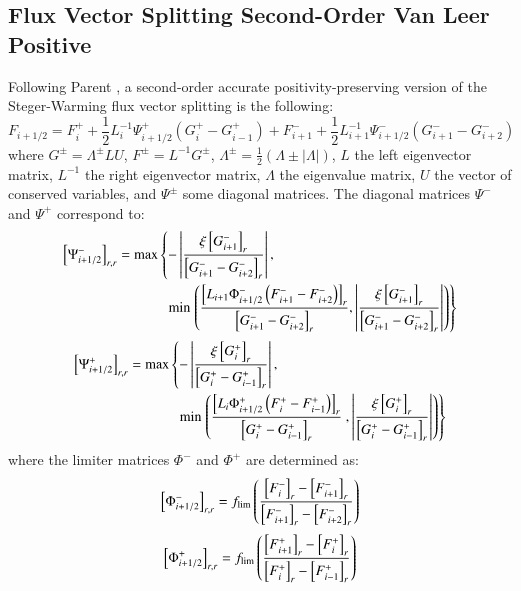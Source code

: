 \documentclass{warpdoc}
\newcommand{\alb}{\vspace{0.2cm}\\} %
\newcommand{\mfd}{\displaystyle}
\begin{document}
\subsection{Flux Vector Splitting Second-Order Van Leer Positive}


Following Parent \cite{jcp:2012:parent}, a second-order accurate positivity-preserving version of the Steger-Warming flux vector splitting is the following:
%
\begin{equation}
F_{i+1/2}=
  F_i^+ 
+\frac{1}{2} L^{-1}_i \Psi^+_{i+1/2} \left(  G_i^+  -  G_{i-1}^+\right)  
+F_{i+1}^-
+\frac{1}{2} L^{-1}_{i+1} \Psi^-_{i+1/2} \left( G_{i+1}^- -  G_{i+2}^-\right) 
\label{eqn:FVS_2o_plus}
\end{equation}
%
where $G^\pm=\Lambda^\pm L U$, $F^\pm = L^{-1} G^\pm$, $\Lambda^\pm=\frac{1}{2}(\Lambda\pm|\Lambda|)$,  $L$ the left eigenvector matrix, $L^{-1}$ the right eigenvector matrix, $\Lambda$ the eigenvalue matrix, $U$ the vector of conserved variables, and $\Psi^\pm$ some diagonal matrices. The diagonal matrices $\Psi^-$ and $\Psi^+$ correspond to:
%
\begin{align}
  \left[\Psi^-_{i+1/2}\right]_{r,r}
=
{\rm max} &\left\{-\left|  \frac{\xi  \left[G_{i+1}^-\right]_r}{\left[G_{i+1}^- - G_{i+2}^-\right]_r } \right|,
\right.\nonumber\alb
&~~~{\rm min} \left.\left(\frac{ \left[L_{i+1} \Phi^-_{i+1/2} \left( F_{i+1}^- -  F_{i+2}^-\right) \right]_r }{ \left[ G_{i+1}^- -  G_{i+2}^-\right]_r },
 \left|  \frac{\xi   \left[G_{i+1}^-\right]_r}{\left[G_{i+1}^- - G_{i+2}^-\right]_r } \right|
\right)\right\}
\end{align}
%
%
\begin{align}
  \left[\Psi^+_{i+1/2}\right]_{r,r} 
= 
{\rm max} &\left\{
-\left| \frac{\xi  \left[G_{i}^+\right]_r}{\left[G_{i}^+ - G_{i-1}^+\right]_r}\right|,~
\right.\nonumber\alb
&~~~{\rm min} \left. \left(
 \frac{\left[L_i \Phi^+_{i+1/2} \left(  F_i^+  -  F_{i-1}^+\right)\right]_r}{\left[  G_i^+  -  G_{i-1}^+\right]_r}~,
\left| \frac{\xi  \left[G_{i}^+\right]_r}{\left[G_{i}^+ - G_{i-1}^+\right]_r}\right|
\right)
\right\}
\end{align}
%
where the limiter matrices $\Phi^-$ and $\Phi^+$ are determined as:
%
\begin{equation}
\left[\Phi_{i+1/2}^-\right]_{r,r} =  {f_{\rm lim}}\left(\mfd\frac{\left[F_{i}^-\right]_r -\left[F_{i+1}^-\right]_r}{\left[F_{i+1}^-\right]_r-\left[F_{i+2}^-\right]_r}  \right) 
\end{equation}
%
%
\begin{equation}
\left[\Phi_{i+1/2}^+\right]_{r,r} =  {f_{\rm lim}}\left(\mfd\frac{\left[F_{i+1}^+\right]_r -\left[F_{i}^+\right]_r}{\left[F_{i}^+\right]_r-\left[F_{i-1}^+\right]_r}  \right)
\end{equation}
\end{document}
